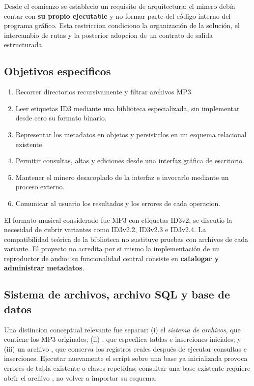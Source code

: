 \documentclass[11pt,a4paper,oneside]{article}
\newcommand{\file}[1]{\texttt{\detokenize{#1}}}
\begin{document}
Desde el comienzo se establecio un requisito de arquitectura: el minero debía contar con \textbf{su propio ejecutable} y no formar parte del código interno del programa gráfico. Esta restriccion condiciono la organización de la solución, el intercambio de rutas y la posterior adopcion de un contrato de salida estructurada.

\subsection{Objetivos especificos}
\begin{enumerate}
\item Recorrer directorios recursivamente y filtrar archivos MP3.
\item Leer etiquetas ID3 mediante una biblioteca especializada, sin implementar desde cero su formato binario.
\item Representar los metadatos en objetos y persistirlos en un esquema relacional existente.
\item Permitir consultas, altas y ediciones desde una interfaz gráfica de escritorio.
\item Mantener el minero desacoplado de la interfaz e invocarlo mediante un proceso externo.
\item Comunicar al usuario los resultados y los errores de cada operacion.
\end{enumerate}

El formato musical considerado fue MP3 con etiquetas ID3v2; se discutio la necesidad de cubrir variantes como ID3v2.2, ID3v2.3 e ID3v2.4. La compatibilidad teórica de la biblioteca no sustituye pruebas con archivos de cada variante. El proyecto no acredita por si mismo la implementación de un reproductor de audio: su funcionalidad central consiste en \textbf{catalogar y administrar metadatos}.

\subsection{Sistema de archivos, archivo SQL y base de datos}
Una distincion conceptual relevante fue separar: (i) el \emph{sistema de archivos}, que contiene los MP3 originales; (ii) \file{rolas.sql}, que específica tablas e inserciones iniciales; y (iii) un archivo \file{.db}, que conserva los registros reales después de ejecutar consultas e inserciones. Ejecutar nuevamente el script sobre una base ya inicializada provoca errores de tabla existente o claves repetidas; consultar una base existente requiere abrir el archivo \file{.db}, no volver a importar su esquema.
\end{document}
